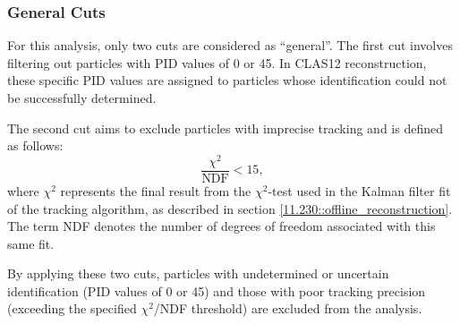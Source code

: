 \subsubsection{General Cuts}
\label{13.21::general_cuts}
    For this analysis, only two cuts are considered as ``general''.
    The first cut involves filtering out particles with PID values of 0 or 45.
    In CLAS12 reconstruction, these specific PID values are assigned to particles whose identification could not be successfully determined.

    The second cut aims to exclude particles with imprecise tracking and is defined as follows:
    \begin{equation*}
        \frac{\chi^2}{\text{NDF}} < 15,
    \end{equation*}
    where $\chi^2$ represents the final result from the $\chi^2$-test used in the Kalman filter fit of the tracking algorithm, as described in section \ref{11.230::offline_reconstruction}.
    The term NDF denotes the number of degrees of freedom associated with this same fit.

    By applying these two cuts, particles with undetermined or uncertain identification (PID values of 0 or 45) and those with poor tracking precision (exceeding the specified $\chi^2$/NDF threshold) are excluded from the analysis.
